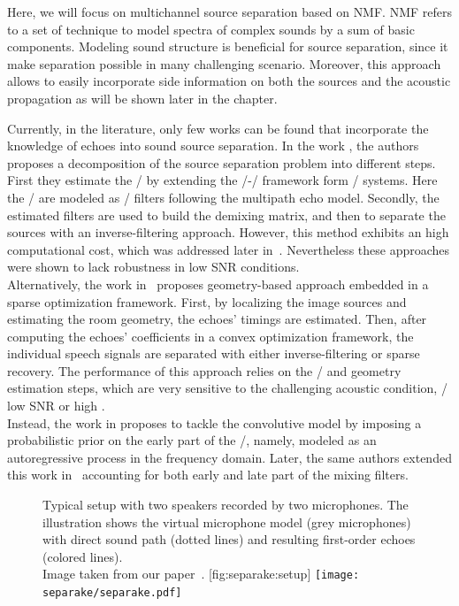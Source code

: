 \mynewline
Here, we will focus on multichannel source separation based on \acf{NMF}.
\ac{NMF} refers to a set of technique to model spectra of complex sounds by a sum of basic components.
Modeling sound structure is beneficial for source separation, since it make separation possible in many challenging scenario.
Moreover, this approach allows to easily incorporate side information on both the sources and the acoustic propagation as will be shown later in the chapter.

\mynewline
Currently, in the literature, only few works can be found that incorporate the knowledge of echoes into sound source separation.
In the work , the authors proposes a decomposition of the source separation problem into different steps.
First they estimate the \RIRs/ by extending the \SIMO/-\BCE/ framework form \MIMO/ systems.
Here the \RIRs/ are modeled as \FIR/ filters following the multipath echo model.
Secondly, the estimated filters are used to build the demixing matrix, and then to separate the sources with an inverse-filtering approach.
However, this method exhibits an high computational cost, which was addressed later in~.
Nevertheless these approaches were shown to lack robustness in low SNR conditions.
\\Alternatively, the work in~ proposes geometry-based approach embedded in a sparse optimization framework.
First, by localizing the image sources and estimating the room geometry, the echoes' timings are estimated.
Then, after computing the echoes' coefficients in a convex optimization framework, the individual speech signals are separated with either inverse-filtering or sparse recovery.
The performance of this approach relies on the \RIR/ and geometry estimation steps, which are very sensitive to the challenging acoustic condition, \eg/ low SNR or high \RT.
\\Instead, the work in  proposes to tackle the convolutive model by imposing a probabilistic prior on the early part of the \RIRs/, namely, modeled as an autoregressive process in the frequency domain.
Later, the same authors extended this work in~ accounting for both early and late part of the mixing filters.


\begin{figure}[]
    \begin{sidecaption}{%
        Typical setup with two speakers recorded by two microphones.
        The illustration shows the virtual microphone model (grey microphones) with direct sound path (dotted lines) and resulting first-order echoes (colored lines).
        \\Image taken from our paper~.
        }[fig:separake:setup]
    \centering
    \texttt{[image: separake/separake.pdf]}
    \end{sidecaption}
\end{figure}

